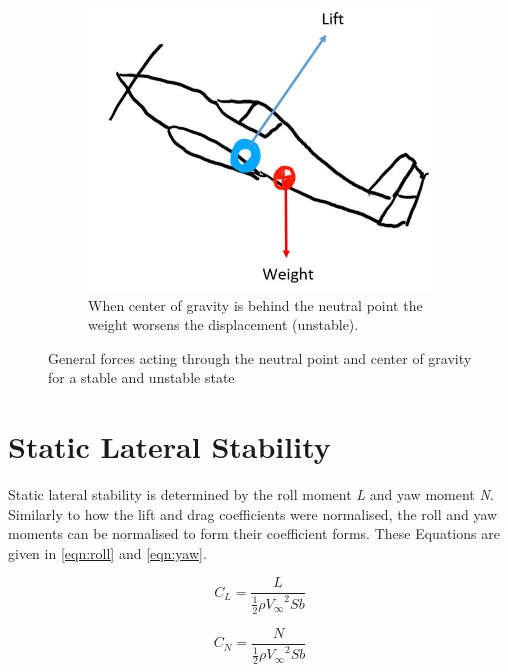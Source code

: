 \begin{figure}[H]
\begin{subfigure}[b]{0.45\textwidth}
         \includegraphics[width=\textwidth]{02_Background/Figs/b3.JPG}
         \caption{When center of gravity is behind the neutral point the weight worsens the displacement (unstable). }
         \label{fig:Pressa2b}
     \end{subfigure}
     \hfill
        \caption{General forces acting through the neutral point and center of gravity for a stable and unstable state}
    \label{fig:stable}
\end{figure}




\section{Static Lateral Stability}

Static lateral stability is determined by the roll moment \textit{L} and yaw moment \textit{N}. Similarly to how the lift and drag coefficients were normalised, the roll and yaw moments can be normalised to form their coefficient forms. These Equations are given in \ref{eqn:roll} and \ref{eqn:yaw}. 

\begin{equation}
    C_L = \frac{L}{\frac{1}{2} \rho {V_\infty}^2 S b }
    \label{eqn:roll}
\end{equation}

\begin{equation}
    C_N = \frac{N}{\frac{1}{2} \rho {V_\infty}^2 S b }
    \label{eqn:yaw}
\end{equation}

